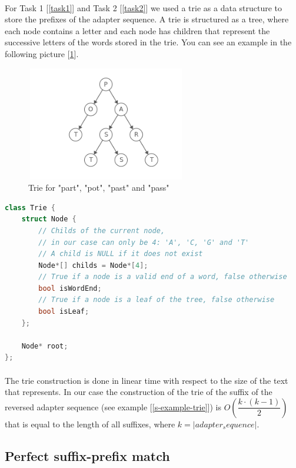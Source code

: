 \documentclass[a4paper,10pt]{article}
\begin{document}
\paragraph{} For Task 1 [\ref{task1}] and Task 2 [\ref{task2}] we used a trie as a data structure to store the prefixes of the adapter sequence.
A trie is structured as a tree, where each node contains a letter and each node has children that represent the successive letters of the words stored in the trie. 
You can see an example in the following picture [\ref{trie-example}].
\begin{figure}[H]
    \centering
    \includegraphics[width=7cm, height=5cm]{images/trie.png}
    \caption{Trie for "part", "pot", "past" and "pass"}
    \label{trie-example}
\end{figure}

\begin{lstlisting}[language=c++, caption=Our trie implementation]
class Trie {
    struct Node {
        // Childs of the current node,
        // in our case can only be 4: 'A', 'C, 'G' and 'T'
        // A child is NULL if it does not exist
        Node*[] childs = Node*[4];
        // True if a node is a valid end of a word, false otherwise
        bool isWordEnd;         
        // True if a node is a leaf of the tree, false otherwise
        bool isLeaf;            
    };

    Node* root;
};
\end{lstlisting}

\paragraph{} The trie construction is done in linear time with respect to the size of the text that represents. In our case the construction of the trie of the suffix of the reversed adapter sequence (see example [\ref{s-example-trie}]) is $O(\dfrac{k\cdot(k-1)} {2})$ that is equal to the length of all suffixes, where $k = |adapter_sequence|$.

\subsection{Perfect suffix-prefix match} \label{perfect-spm}
\end{document}
